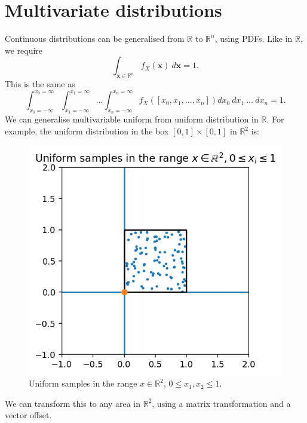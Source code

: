 \documentclass[a4paper, openany]{memoir}
\begin{document}
\section{Multivariate distributions}
Continuous distributions can be generalised from $\mathbb{R}$ to $\mathbb{R}^n$, using PDFs. Like in $\mathbb{R}$, we require
\[\int_{\mathbf{x} \in \mathbb{R}^n} f_X(\mathbf{x}) \ d\mathbf{x} = 1.\]
This is the same as
\[\int_{x_0 = -\infty}^{x_0 = \infty} \int_{x_1 = -\infty}^{x_1 = \infty} \dots \int_{x_n = -\infty}^{x_n = \infty} f_X([x_0, x_1, \dots, x_n]) dx_0 \ dx_1 \ \dots \ dx_n = 1.\]
We can generalise multivariable uniform from uniform distribution in $\mathbb{R}$. For example, the uniform distribution in the box $[0, 1] \times [0, 1]$ in $\mathbb{R}^2$ is:
\begin{figure}[H]
    \centering
    \includegraphics[scale=0.5]{src/5.19 uniform samples in a box.png}
    \caption{Uniform samples in the range $x \in \mathbb{R}^2$, $0 \leq x_1, x_2 \leq 1$.}
\end{figure}
\noindent We can transform this to any area in $\mathbb{R}^2$, using a matrix transformation and a vector offset.
\end{document}
